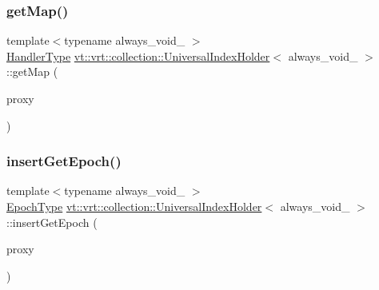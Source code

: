 \subsubsection{\texorpdfstring{get\+Map()}{getMap()}}
{\footnotesize\ttfamily template$<$typename always\+\_\+void\+\_\+ $>$ \\
\hyperlink{namespacevt_af64846b57dfcaf104da3ef6967917573}{Handler\+Type} \hyperlink{structvt_1_1vrt_1_1collection_1_1_universal_index_holder}{vt\+::vrt\+::collection\+::\+Universal\+Index\+Holder}$<$ always\+\_\+void\+\_\+ $>$\+::get\+Map (\begin{DoxyParamCaption}\item[{\hyperlink{namespacevt_a1b417dd5d684f045bb58a0ede70045ac}{Virtual\+Proxy\+Type} const}]{proxy }\end{DoxyParamCaption})\hspace{0.3cm}{\ttfamily [static]}}

\mbox{\label{structvt_1_1vrt_1_1collection_1_1_universal_index_holder_a45b646ebb0be1787d3893f4e719ed031}} 
\subsubsection{\texorpdfstring{insert\+Get\+Epoch()}{insertGetEpoch()}}
{\footnotesize\ttfamily template$<$typename always\+\_\+void\+\_\+ $>$ \\
\hyperlink{namespacevt_a985a5adf291c34a3ca263b3378388236}{Epoch\+Type} \hyperlink{structvt_1_1vrt_1_1collection_1_1_universal_index_holder}{vt\+::vrt\+::collection\+::\+Universal\+Index\+Holder}$<$ always\+\_\+void\+\_\+ $>$\+::insert\+Get\+Epoch (\begin{DoxyParamCaption}\item[{\hyperlink{namespacevt_a1b417dd5d684f045bb58a0ede70045ac}{Virtual\+Proxy\+Type} const}]{proxy }\end{DoxyParamCaption})\hspace{0.3cm}{\ttfamily [static]}}

\mbox{\label{structvt_1_1vrt_1_1collection_1_1_universal_index_holder_a1c22a6f3bff59afb3fc5d86e083a7bdc}} 
